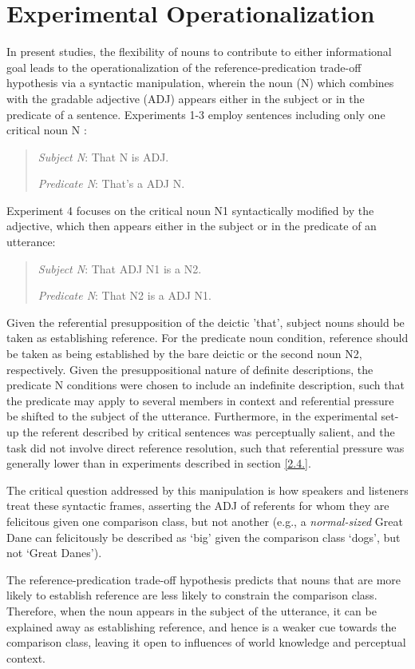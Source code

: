 \section{Experimental Operationalization}
\label{3.2.}
In present studies, the flexibility of nouns to contribute to either informational goal leads to the operationalization of the reference-predication trade-off hypothesis via a syntactic manipulation, wherein the noun (N) which combines with the gradable adjective (ADJ) appears either in the subject or in the predicate of a sentence. Experiments 1-3 employ sentences including only one critical noun N \parencite{tessler2020}:
\begin{quotation}
	\textit{Subject N}: That N is ADJ. 
	
	\textit{Predicate N}: That's a ADJ N.
\end{quotation}
Experiment 4 focuses on the critical noun N1 syntactically modified by the adjective, which then appears either in the subject or in the predicate of an utterance: 
\begin{quotation}
	\textit{Subject N}: That ADJ N1 is a N2. 
	 
	\textit{Predicate N}: That N2 is a ADJ N1.
\end{quotation} 
Given the referential presupposition of the deictic 'that', subject nouns should be taken as establishing reference.  For the predicate noun condition, reference should be taken as being established by the bare deictic or the second noun N2, respectively. Given the presuppositional nature of definite descriptions, the predicate N conditions were chosen to include an indefinite description, such that the predicate may apply to several members in context and referential pressure be shifted to the subject of the utterance. Furthermore, in the experimental set-up the referent described by critical sentences was perceptually salient, and the task did not involve direct reference resolution, such that referential pressure was generally lower than in experiments described in section \ref{2.4.}.

The critical question addressed by this manipulation is how speakers and listeners treat these syntactic frames, asserting the ADJ of referents for whom they are felicitous given one comparison class, but not another (e.g., a \emph{normal-sized} Great Dane can felicitously be described as ‘big’ given the comparison class ‘dogs’, but not ‘Great Danes’). 

The reference-predication trade-off hypothesis predicts that nouns that are more likely to establish reference are less likely to constrain the comparison class. Therefore, when the noun appears in the subject of the utterance, it can be explained away as establishing reference, and hence is a weaker cue towards the comparison class, leaving it open to influences of world knowledge and perceptual context. 

